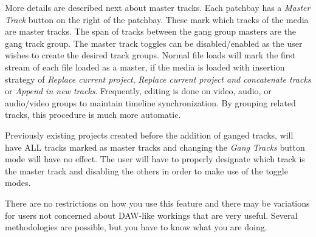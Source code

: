 More details are described next about master tracks. Each patchbay has a \textit{Master Track} button on the right of the patchbay. These mark which tracks of the media are master tracks. The span of tracks between the gang group masters are the gang track group. The master track toggles can be disabled/enabled as the user wishes to create the desired track groups. Normal file loads will mark the first stream of each file loaded as a master, if the media is loaded with insertion strategy of\textit{ Replace current project}, \textit{Replace current project and concatenate tracks} or \textit{Append in new tracks}. Frequently, editing is done on video, audio, or audio/video groups to maintain timeline synchronization. By grouping related tracks, this procedure is much more automatic.

Previously existing projects created before the addition of ganged tracks, will have ALL tracks marked as master tracks and changing the \textit{Gang Tracks} button mode will have no effect. The user will have to properly designate which track is the master track and disabling the others in order to make use of the toggle modes.

There are no restrictions on how you use this feature and there may be variations for users not concerned about DAW-like workings that are very useful. Several methodologies are possible, but you have to know what you are doing.

